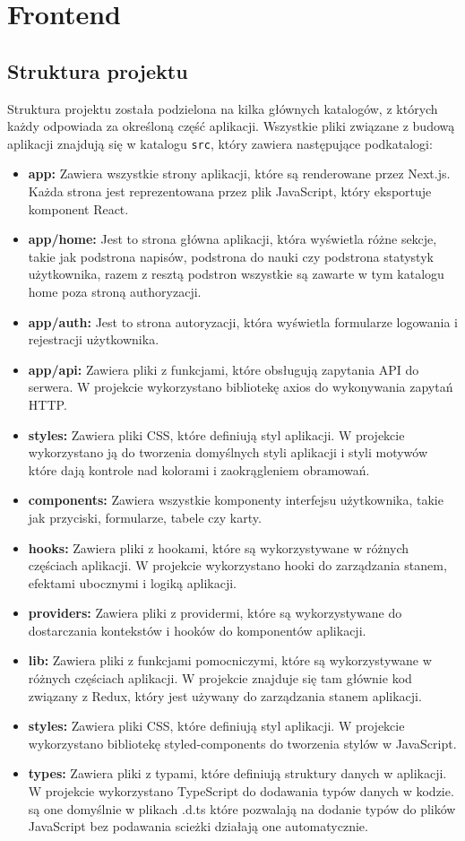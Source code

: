 
\section{Frontend}
\subsection{Struktura projektu}
Struktura projektu została podzielona na kilka głównych katalogów, z których każdy odpowiada za określoną część aplikacji. Wszystkie pliki związane z budową aplikacji znajdują się w katalogu \texttt{src}, który zawiera następujące podkatalogi:
\begin{itemize}
    \item \textbf{app:} Zawiera wszystkie strony aplikacji, które są renderowane przez Next.js. Każda strona jest reprezentowana przez plik JavaScript, który eksportuje komponent React.
    \item \textbf{app/home:} Jest to strona główna aplikacji, która wyświetla różne sekcje, takie jak podstrona napisów, podstrona do nauki czy podstrona statystyk użytkownika, razem z resztą podstron wszystkie są zawarte w tym katalogu home poza stroną authoryzacji.
    \item \textbf{app/auth:} Jest to strona autoryzacji, która wyświetla formularze logowania i rejestracji użytkownika.
    \item \textbf{app/api:} Zawiera pliki z funkcjami, które obsługują zapytania API do serwera. W projekcie wykorzystano bibliotekę axios do wykonywania zapytań HTTP.
    \item \textbf{styles:} Zawiera pliki CSS, które definiują styl aplikacji. W projekcie wykorzystano ją do tworzenia domyślnych styli aplikacji i styli motywów które dają kontrole nad kolorami i zaokrągleniem obramowań.
    \item \textbf{components:} Zawiera wszystkie komponenty interfejsu użytkownika, takie jak przyciski, formularze, tabele czy karty.
    \item \textbf{hooks:} Zawiera pliki z hookami, które są wykorzystywane w różnych częściach aplikacji. W projekcie wykorzystano hooki do zarządzania stanem, efektami ubocznymi i logiką aplikacji.
    \item \textbf{providers:} Zawiera pliki z providermi, które są wykorzystywane do dostarczania kontekstów i hooków do komponentów aplikacji.
    \item \textbf{lib:} Zawiera pliki z funkcjami pomocniczymi, które są wykorzystywane w różnych częściach aplikacji. W projekcie znajduje się tam głównie kod związany z Redux, który jest używany do zarządzania stanem aplikacji.
    \item \textbf{styles:} Zawiera pliki CSS, które definiują styl aplikacji. W projekcie wykorzystano bibliotekę styled-components do tworzenia stylów w JavaScript.
    \item \textbf{types:} Zawiera pliki z typami, które definiują struktury danych w aplikacji. W projekcie wykorzystano TypeScript do dodawania typów danych w kodzie. są one domyślnie w plikach .d.ts które pozwalają na dodanie typów do plików JavaScript bez podawania scieżki działają one automatycznie.
\end{itemize}

